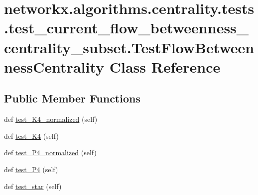 \hypertarget{classnetworkx_1_1algorithms_1_1centrality_1_1tests_1_1test__current__flow__betweenness__centralib3c1da27deaacbf64e13c5acae21dc9e}{}\section{networkx.\+algorithms.\+centrality.\+tests.\+test\+\_\+current\+\_\+flow\+\_\+betweenness\+\_\+centrality\+\_\+subset.\+Test\+Flow\+Betweenness\+Centrality Class Reference}
\label{classnetworkx_1_1algorithms_1_1centrality_1_1tests_1_1test__current__flow__betweenness__centralib3c1da27deaacbf64e13c5acae21dc9e}
\subsection*{Public Member Functions}
\begin{DoxyCompactItemize}
\item 
def \hyperlink{classnetworkx_1_1algorithms_1_1centrality_1_1tests_1_1test__current__flow__betweenness__centralib3c1da27deaacbf64e13c5acae21dc9e_ae5b7af5bbfd94968e86c46c5b65696d3}{test\+\_\+\+K4\+\_\+normalized} (self)
\item 
def \hyperlink{classnetworkx_1_1algorithms_1_1centrality_1_1tests_1_1test__current__flow__betweenness__centralib3c1da27deaacbf64e13c5acae21dc9e_ae52c903ebfcdb587e50e9a55d2273159}{test\+\_\+\+K4} (self)
\item 
def \hyperlink{classnetworkx_1_1algorithms_1_1centrality_1_1tests_1_1test__current__flow__betweenness__centralib3c1da27deaacbf64e13c5acae21dc9e_aa4c532c51c10f21f06c8ab7295f293a1}{test\+\_\+\+P4\+\_\+normalized} (self)
\item 
def \hyperlink{classnetworkx_1_1algorithms_1_1centrality_1_1tests_1_1test__current__flow__betweenness__centralib3c1da27deaacbf64e13c5acae21dc9e_ab0449a831476a67154560a2ff08466e0}{test\+\_\+\+P4} (self)
\item 
def \hyperlink{classnetworkx_1_1algorithms_1_1centrality_1_1tests_1_1test__current__flow__betweenness__centralib3c1da27deaacbf64e13c5acae21dc9e_a43349828ca13d95959797450d4240bdb}{test\+\_\+star} (self)
\end{DoxyCompactItemize}


